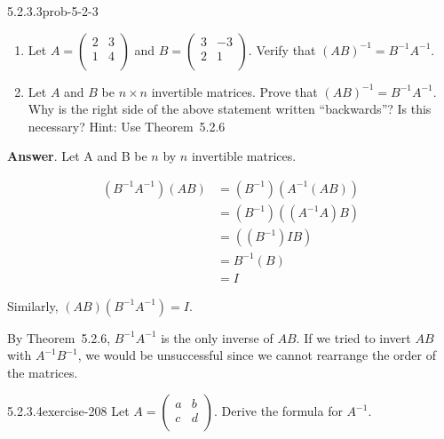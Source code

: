 \documentclass[twoside,10pt,]{book}
\numberwithin{equation}{section}
\begin{document}
\begin{divisionsolution}{5.2.3.3}{}{prob-5-2-3}%
\hypertarget{p-1821}{}%
\leavevmode%
\begin{enumerate}[label=(\alph*)]
\item\hypertarget{li-966}{}Let \(A = \left(
\begin{array}{cc}
2 & 3 \\
1 & 4 \\
\end{array}
\right)\) and \(B =\left(
\begin{array}{cc}
3 & -3 \\
2 & 1 \\
\end{array}
\right)\). Verify that \((A B)^{-1}= B^{-1}A^{-1}\).%
\item\hypertarget{li-967}{}Let \(A\) and \(B\) be \(n\times n\) invertible matrices. Prove that \((A B)^{-1}= B^{-1}A^{-1}\). Why is the right side of the above statement written ``backwards''? Is this necessary? Hint: Use Theorem~5.2.6%
\end{enumerate}
%
\par\smallskip%
\noindent\textbf{Answer}.\quad%
\hypertarget{p-1822}{}%
Let A and B be \(n\) by \(n\) invertible matrices.%
\par
\hypertarget{p-1823}{}%
%
\begin{equation*}
\begin{split}
\left(B^{-1}A^{-1}\right)(AB)&=\left(B^{-1}\right)\left(A^{-1}(AB)\right)\\
&= \left(B^{-1}\right) \left(\left(A^{-1} A\right) B\right)\\
&=(\left(B^{-1}\right)I B )\\
&=B^{-1}(B)\\
&=I 
\end{split}
\end{equation*}
%
\par
\hypertarget{p-1824}{}%
Similarly, \((AB)\left(B^{-1}A^{-1}\right)=I\).%
\par
\hypertarget{p-1825}{}%
By Theorem~5.2.6, \(B^{-1}A^{-1}\) is the only inverse of \(AB\). If we tried to invert \(AB\) with \(A^{-1}B^{-1}\), we would be unsuccessful since we cannot rearrange the order of the matrices.%
\end{divisionsolution}%
\begin{divisionsolution}{5.2.3.4}{}{exercise-208}%
\hypertarget{p-1826}{}%
Let \(A =\left(
\begin{array}{cc}
a & b \\
c & d \\
\end{array}
\right)\). Derive the formula for \(A^{-1}\).%
\end{divisionsolution}%
\end{document}
